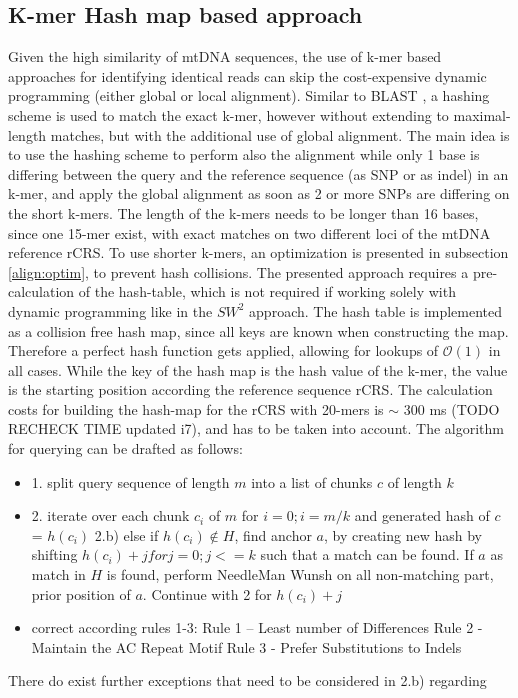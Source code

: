 \subsection{K-mer Hash map based approach}
Given the high similarity of mtDNA sequences, the use of k-mer based approaches for identifying identical reads can skip the cost-expensive dynamic programming (either global or local alignment). Similar to BLAST \cite{Altschul1990}, a hashing scheme is used to match the exact k-mer, however without extending to maximal-length matches, but with the additional use of global alignment. The main idea is to use the hashing scheme to perform also the alignment while only 1 base is differing between the query and the reference sequence (as SNP or as indel) in an k-mer, and apply the global alignment as soon as 2 or more SNPs are differing on the short k-mers. The length of the k-mers needs to be longer than 16 bases, since one 15-mer exist, with exact matches on two different loci of the mtDNA reference rCRS. To use shorter k-mers, an optimization is presented in subsection \ref{align:optim}, to prevent hash collisions.
The presented approach requires a pre-calculation of the hash-table, which is not required if working solely with dynamic programming like in the $SW^{2}$ approach.
The hash table is implemented as a collision free hash map, since all keys are known when constructing the map. Therefore a perfect hash function gets applied, allowing for lookups of $\mathcal{O}(1)$ in all cases. While the key of the hash map is the hash value of the k-mer, the value is the starting position according the reference sequence rCRS. The calculation costs for building the hash-map for the rCRS with 20-mers is $\sim$ 300 ms (TODO RECHECK TIME updated i7), and has to be taken into account.
The algorithm for querying can be drafted as follows:
\begin{itemize}
\item 1. split query sequence of length $m$ into a list of chunks $c$ of length $k$
\item 2. iterate over each chunk $c_i$ of $m$ for $i=0; i= m/k$ and generated hash of $c$ = $h(c_i)$
\subitem 2.b) else if $h(c_i) \notin H$, find anchor $a$, by creating new hash by shifting    $h(c_i)+j for j =0; j<=k$ such that a match can be found. If $a$ as match in $H$ is found, perform NeedleMan Wunsh on all non-matching part, prior position of $a$. Continue with 2 for $h(c_i)+j$
\item correct according rules 1-3: 
\subitem  Rule 1 – Least number of Differences
\subitem Rule 2 - Maintain the AC Repeat Motif
\subitem Rule 3 -  Prefer Substitutions to Indels
\end{itemize}
There do exist further exceptions that need to be considered in 2.b) regarding  
